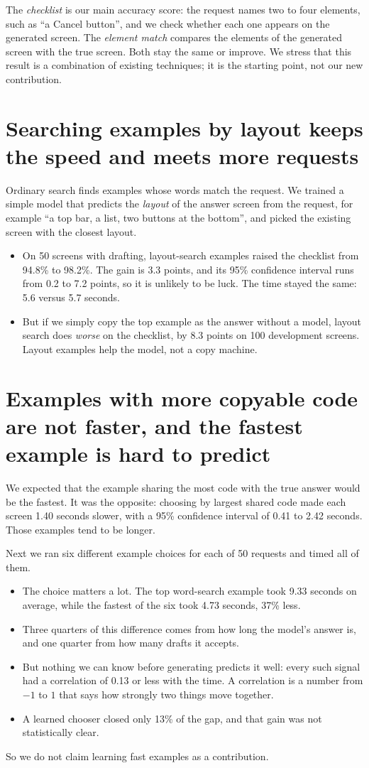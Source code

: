 \documentclass[10pt,a4paper]{article}
\begin{document}
The \emph{checklist} is our main accuracy score: the request names two to four elements, such as ``a Cancel button'', and we check whether each one appears on the generated screen. The \emph{element match} compares the elements of the generated screen with the true screen. Both stay the same or improve. We stress that this result is a combination of existing techniques; it is the starting point, not our new contribution.

\section{Searching examples by layout keeps the speed and meets more requests}
Ordinary search finds examples whose words match the request. We trained a simple model that predicts the \emph{layout} of the answer screen from the request, for example ``a top bar, a list, two buttons at the bottom'', and picked the existing screen with the closest layout.
\begin{itemize}[itemsep=1pt]
\item On 50 screens with drafting, layout-search examples raised the checklist from 94.8\% to 98.2\%. The gain is 3.3 points, and its 95\% confidence interval runs from 0.2 to 7.2 points, so it is unlikely to be luck. The time stayed the same: 5.6 versus 5.7 seconds.
\item But if we simply copy the top example as the answer without a model, layout search does \emph{worse} on the checklist, by 8.3 points on 100 development screens. Layout examples help the model, not a copy machine.
\end{itemize}

\section{Examples with more copyable code are not faster, and the fastest example is hard to predict}
We expected that the example sharing the most code with the true answer would be the fastest. It was the opposite: choosing by largest shared code made each screen 1.40 seconds slower, with a 95\% confidence interval of 0.41 to 2.42 seconds. Those examples tend to be longer.

Next we ran six different example choices for each of 50 requests and timed all of them.
\begin{itemize}[itemsep=1pt]
\item The choice matters a lot. The top word-search example took 9.33 seconds on average, while the fastest of the six took 4.73 seconds, 37\% less.
\item Three quarters of this difference comes from how long the model's answer is, and one quarter from how many drafts it accepts.
\item But nothing we can know before generating predicts it well: every such signal had a correlation of 0.13 or less with the time. A correlation is a number from $-1$ to $1$ that says how strongly two things move together.
\item A learned chooser closed only 13\% of the gap, and that gain was not statistically clear.
\end{itemize}
So we do not claim learning fast examples as a contribution.
\end{document}

